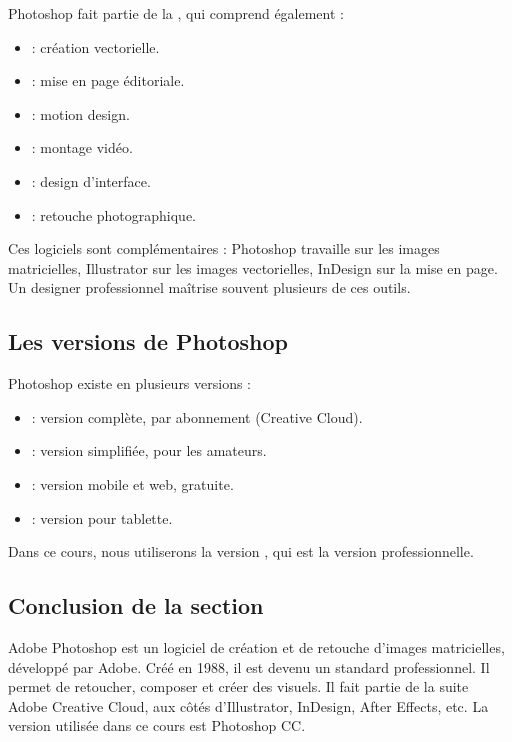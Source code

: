 Photoshop fait partie de la , qui comprend également :

\begin{itemize}
    \item {} : création vectorielle.
    \item {} : mise en page éditoriale.
    \item {} : motion design.
    \item {} : montage vidéo.
    \item {} : design d'interface.
    \item {} : retouche photographique.
\end{itemize}

Ces logiciels sont complémentaires : Photoshop travaille sur les images matricielles, Illustrator sur les images vectorielles, InDesign sur la mise en page. Un designer professionnel maîtrise souvent plusieurs de ces outils.

\subsection{Les versions de Photoshop}

Photoshop existe en plusieurs versions :

\begin{itemize}
    \item {} : version complète, par abonnement (Creative Cloud).
    \item {} : version simplifiée, pour les amateurs.
    \item {} : version mobile et web, gratuite.
    \item {} : version pour tablette.
\end{itemize}

Dans ce cours, nous utiliserons la version , qui est la version professionnelle.

\subsection*{Conclusion de la section}

Adobe Photoshop est un logiciel de création et de retouche d'images matricielles, développé par Adobe. Créé en 1988, il est devenu un standard professionnel. Il permet de retoucher, composer et créer des visuels. Il fait partie de la suite Adobe Creative Cloud, aux côtés d'Illustrator, InDesign, After Effects, etc. La version utilisée dans ce cours est Photoshop CC.

